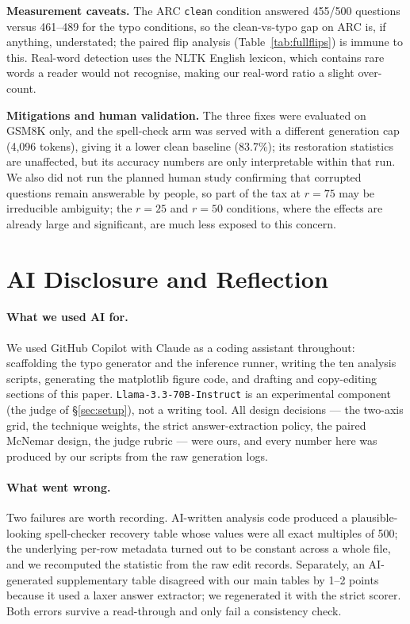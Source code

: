 \documentclass[11pt]{article}
\begin{document}
\textbf{Measurement caveats.} The ARC \texttt{clean} condition answered
455/500 questions versus 461--489 for the typo conditions, so the clean-vs-typo
gap on ARC is, if anything, understated; the paired flip analysis
(Table~\ref{tab:fullflips}) is immune to this. Real-word detection uses the
NLTK English lexicon, which contains rare words a reader would not recognise,
making our real-word ratio a slight over-count.

\textbf{Mitigations and human validation.} The three fixes were evaluated on
GSM8K only, and the spell-check arm was served with a different generation cap
(4{,}096 tokens), giving it a lower clean baseline (83.7\%); its restoration
statistics are unaffected, but its accuracy numbers are only interpretable
within that run. We also did not run the
planned human study confirming that corrupted questions remain answerable by
people, so part of the tax at $r{=}75$ may be irreducible ambiguity; the
$r{=}25$ and $r{=}50$ conditions, where the effects are already large and
significant, are much less exposed to this concern.

\section{AI Disclosure and Reflection}
\label{sec:ai}

\paragraph{What we used AI for.} We used GitHub Copilot with Claude as a coding
assistant throughout: scaffolding the typo generator and the inference runner,
writing the ten analysis scripts, generating the matplotlib figure code, and
drafting and copy-editing sections of this paper.
\texttt{Llama-3.3-70B-Instruct} is an experimental component (the judge of
\S\ref{sec:setup}), not a writing tool. All design decisions --- the two-axis
grid, the technique weights, the strict answer-extraction policy, the paired
McNemar design, the judge rubric --- were ours, and every number here was
produced by our scripts from the raw generation logs.

\paragraph{What went wrong.} Two failures are worth recording. AI-written
analysis code produced a plausible-looking spell-checker recovery table whose
values were all exact multiples of 500; the underlying per-row metadata turned
out to be constant across a whole file, and we recomputed the statistic from the
raw edit records. Separately, an AI-generated supplementary table disagreed with
our main tables by 1--2 points because it used a laxer answer extractor; we
regenerated it with the strict scorer. Both errors survive a read-through and
only fail a consistency check.
\end{document}

